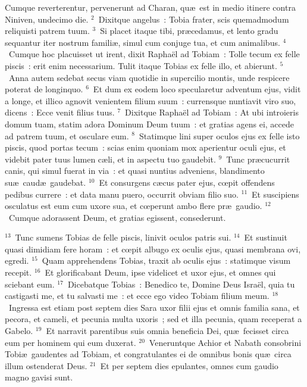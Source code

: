 \lettrine[lines=10,image=true,loversize=0.05,lraise=-0.03]{C}{}umque reverterentur, pervenerunt ad Charan, qu\ae\ est in medio itinere contra Niniven, undecimo die.
${}^{2}$~Dixitque angelus~: Tobia frater, scis quemadmodum reliquisti patrem tuum.
${}^{3}$~Si placet itaque tibi, pr\ae cedamus, et lento gradu sequantur iter nostrum famili\ae , simul cum conjuge tua, et cum animalibus.
${}^{4}$~Cumque hoc placuisset ut irent, dixit Rapha\"el ad Tobiam~: Tolle tecum ex felle piscis~: erit enim necessarium. Tulit itaque Tobias ex felle illo, et abierunt.
${}^{5}$~Anna autem sedebat secus viam quotidie in supercilio montis, unde respicere poterat de longinquo.
${}^{6}$~Et dum ex eodem loco specularetur adventum ejus, vidit a longe, et illico agnovit venientem filium suum~: currensque nuntiavit viro suo, dicens~: Ecce venit filius tuus.
${}^{7}$~Dixitque Rapha\"el ad Tobiam~: At ubi introieris domum tuam, statim adora Dominum Deum tuum~: et gratias agens ei, accede ad patrem tuum, et osculare eum.
${}^{8}$~Statimque lini super oculos ejus ex felle isto piscis, quod portas tecum~: scias enim quoniam mox aperientur oculi ejus, et videbit pater tuus lumen c\ae li, et in aspectu tuo gaudebit.
${}^{9}$~Tunc pr\ae cucurrit canis, qui simul fuerat in via~: et quasi nuntius adveniens, blandimento su\ae\ caud\ae\ gaudebat.
${}^{10}$~Et consurgens c\ae cus pater ejus, cœpit offendens pedibus currere~: et data manu puero, occurrit obviam filio suo.
${}^{11}$~Et suscipiens osculatus est eum cum uxore sua, et cœperunt ambo flere pr\ae\ gaudio.
${}^{12}$~Cumque adorassent Deum, et gratias egissent, consederunt.


${}^{13}$~Tunc sumens Tobias de felle piscis, linivit oculos patris sui.
${}^{14}$~Et sustinuit quasi dimidiam fere horam~: et cœpit albugo ex oculis ejus, quasi membrana ovi, egredi.
${}^{15}$~Quam apprehendens Tobias, traxit ab oculis ejus~: statimque visum recepit.
${}^{16}$~Et glorificabant Deum, ipse videlicet et uxor ejus, et omnes qui sciebant eum.
${}^{17}$~Dicebatque Tobias~: Benedico te, Domine Deus Isra\"el, quia tu castigasti me, et tu salvasti me~: et ecce ego video Tobiam filium meum.
${}^{18}$~Ingressa est etiam post septem dies Sara uxor filii ejus et omnis familia sana, et pecora, et cameli, et pecunia multa uxoris~; sed et illa pecunia, quam receperat a Gabelo.
${}^{19}$~Et narravit parentibus suis omnia beneficia Dei, qu\ae\ fecisset circa eum per hominem qui eum duxerat.
${}^{20}$~Veneruntque Achior et Nabath consobrini Tobi\ae\ gaudentes ad Tobiam, et congratulantes ei de omnibus bonis qu\ae\ circa illum ostenderat Deus.
${}^{21}$~Et per septem dies epulantes, omnes cum gaudio magno gavisi sunt.

